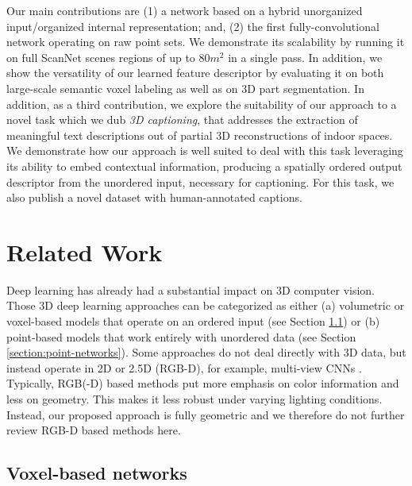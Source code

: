 \documentclass[runningheads]{llncs}
\begin{document}
Our main contributions are (1) a network based on a hybrid unorganized input/organized internal representation; and, (2) the first fully-convolutional network operating on raw point sets. We demonstrate its scalability by running it on full ScanNet scenes regions of up to $80m^2$ in a single pass. In addition, we show the versatility of our learned feature descriptor by evaluating it on both large-scale semantic voxel labeling as well as on 3D part segmentation. In addition, as a third contribution, we explore the suitability of our approach to a novel task which we dub \textit{3D captioning}, that addresses the extraction of meaningful text descriptions out of partial 3D reconstructions of indoor spaces.
We demonstrate how our approach is well suited to deal with this task leveraging its ability to embed contextual information, producing a spatially ordered output descriptor from the unordered input, necessary for captioning. For this task, we also publish a novel dataset with human-annotated captions.



\section{Related Work}

Deep learning has already had a substantial impact on 3D computer vision. Those 3D deep learning approaches can be categorized as either (a) volumetric or voxel-based models that operate on an ordered input (see Section \ref{section:voxel-networks}) or (b) point-based models that work entirely with unordered data (see Section \ref{section:point-networks}).
Some approaches do not deal directly with 3D data, but instead operate in 2D or 2.5D (RGB-D), for example, multi-view CNNs \cite{Su2015,Qi2016,Kaiming2017}. Typically, RGB(-D) based methods put more emphasis on color information and less on geometry. This makes it less robust under varying lighting conditions. Instead, our proposed approach is fully geometric and we therefore do not further review RGB-D based methods here.


\subsection{Voxel-based networks}
\label{section:voxel-networks}
\end{document}
